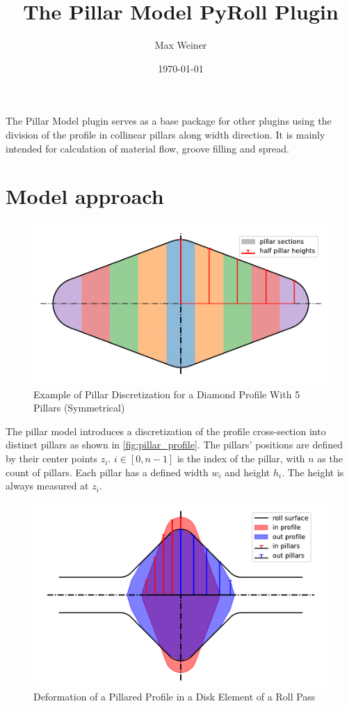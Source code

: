 \documentclass[11pt]{PyRollDocs}
\begin{document}
    \title{The Pillar Model PyRoll Plugin}
    \author{Max Weiner}
    \date{\today}

    \maketitle

    The Pillar Model plugin serves as a base package for other plugins using the division of the profile in collinear pillars along width direction.
    It is mainly intended for calculation of material flow, groove filling and spread.


    \section{Model approach}\label{sec:model-approach}

    \begin{figure}
        \centering
        \includegraphics[width=0.6\linewidth]{img/pillar_profile}
        \caption{Example of Pillar Discretization for a Diamond Profile With 5 Pillars (Symmetrical)}
        \label{fig:pillar_profile}
    \end{figure}

    The pillar model introduces a discretization of the profile cross-section into distinct pillars as shown in \autoref{fig:pillar_profile}.
    The pillars' positions are defined by their center points $z_i$.
    $i \in [0, n - 1]$ is the index of the pillar, with $n$ as the count of pillars.
    Each pillar has a defined width $w_i$ and height $h_i$.
    The height is always measured at $z_i$.

    \begin{figure}
        \centering
        \includegraphics[width=0.6\linewidth]{img/pillar_disk_element}
        \caption{Deformation of a Pillared Profile in a Disk Element of a Roll Pass}
        \label{fig:pillar_disk_element}
    \end{figure}
\end{document}
